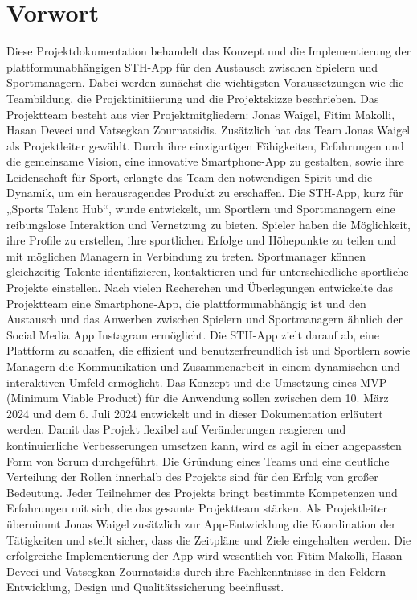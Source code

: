 \chapter{Vorwort}
Diese Projektdokumentation behandelt das Konzept und die Implementierung der plattformunabhängigen STH-App für den Austausch zwischen Spielern und Sportmanagern.
Dabei werden zunächst die wichtigsten Voraussetzungen wie die Teambildung, die Projektinitiierung und die Projektskizze beschrieben.
Das Projektteam besteht aus vier Projektmitgliedern: Jonas Waigel, Fitim Makolli, Hasan Deveci und Vatsegkan Zournatsidis.
Zusätzlich hat das Team Jonas Waigel als Projektleiter gewählt.
Durch ihre einzigartigen Fähigkeiten, Erfahrungen und die gemeinsame Vision, eine innovative Smartphone-App zu gestalten, sowie ihre Leidenschaft für Sport, erlangte das Team den notwendigen Spirit und die Dynamik, um ein herausragendes Produkt zu erschaffen.
\newline
Die STH-App, kurz für „Sports Talent Hub“, wurde entwickelt, um Sportlern und Sportmanagern eine reibungslose Interaktion und Vernetzung zu bieten.
Spieler haben die Möglichkeit, ihre Profile zu erstellen, ihre sportlichen Erfolge und Höhepunkte zu teilen und mit möglichen Managern in Verbindung zu treten.
Sportmanager können gleichzeitig Talente identifizieren, kontaktieren und für unterschiedliche sportliche Projekte einstellen.
\newline
Nach vielen Recherchen und Überlegungen entwickelte das Projektteam eine Smartphone-App, die plattformunabhängig ist und den Austausch und das Anwerben zwischen Spielern und Sportmanagern ähnlich der Social Media App Instagram ermöglicht.
Die STH-App zielt darauf ab, eine Plattform zu schaffen, die effizient und benutzerfreundlich ist und Sportlern sowie Managern die Kommunikation und Zusammenarbeit in einem dynamischen und interaktiven Umfeld ermöglicht.
\newline
Das Konzept und die Umsetzung eines MVP (Minimum Viable Product) für die Anwendung sollen zwischen dem 10. März 2024 und dem 6. Juli 2024 entwickelt und in dieser Dokumentation erläutert werden.
Damit das Projekt flexibel auf Veränderungen reagieren und kontinuierliche Verbesserungen umsetzen kann, wird es agil in einer angepassten Form von Scrum durchgeführt.
Die Gründung eines Teams und eine deutliche Verteilung der Rollen innerhalb des Projekts sind für den Erfolg von großer Bedeutung.
Jeder Teilnehmer des Projekts bringt bestimmte Kompetenzen und Erfahrungen mit sich, die das gesamte Projektteam stärken.
Als Projektleiter übernimmt Jonas Waigel zusätzlich zur App-Entwicklung die Koordination der Tätigkeiten und stellt sicher, dass die Zeitpläne und Ziele eingehalten werden.
Die erfolgreiche Implementierung der App wird wesentlich von Fitim Makolli, Hasan Deveci und Vatsegkan Zournatsidis durch ihre Fachkenntnisse in den Feldern Entwicklung, Design und Qualitätssicherung beeinflusst.
